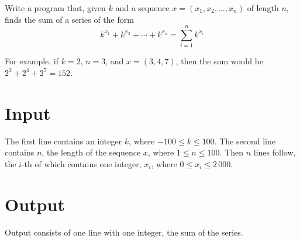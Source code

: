 
Write a program that, given $k$ and a sequence $x = (x_1, x_2, \dots, x_n)$ of length $n$,
finds the sum of a series of the form
\[k^{x_1}+k^{x_2}+\cdots+k^{x_n} = \sum_{i=1}^n k^{x_i}\]

For example, if $k = 2$, $n=3$, and $x = (3, 4, 7)$, then the sum would be $2^3 + 2^4 + 2^7 = 152$.

\section*{Input}
The first line contains an integer $k$, where $-100 \leq k \leq 100$.
The second line contains $n$, the length of the sequence $x$, where $1 \leq n \leq 100$.
Then $n$ lines follow, the $i$-th of which contains one integer, $x_i$, where $0 \leq x_i \leq 2\,000$.

\section*{Output}
Output consists of one line with one integer, the sum of the series.
